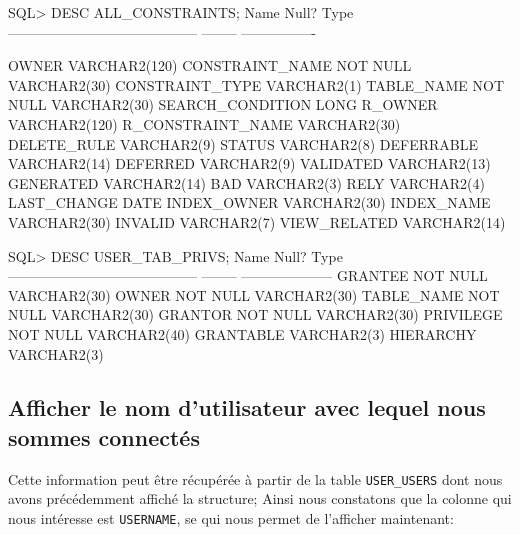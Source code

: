 \documentclass[•]{article}
\begin{document}
\begin{sql}
SQL> DESC ALL_CONSTRAINTS;
 Name                                      Null?    Type
 ----------------------------------------- -------- ----------------

 OWNER                                              VARCHAR2(120)
 CONSTRAINT_NAME                           NOT NULL VARCHAR2(30)
 CONSTRAINT_TYPE                                    VARCHAR2(1)
 TABLE_NAME                                NOT NULL VARCHAR2(30)
 SEARCH_CONDITION                                   LONG
 R_OWNER                                            VARCHAR2(120)
 R_CONSTRAINT_NAME                                  VARCHAR2(30)
 DELETE_RULE                                        VARCHAR2(9)
 STATUS                                             VARCHAR2(8)
 DEFERRABLE                                         VARCHAR2(14)
 DEFERRED                                           VARCHAR2(9)
 VALIDATED                                          VARCHAR2(13)
 GENERATED                                          VARCHAR2(14)
 BAD                                                VARCHAR2(3)
 RELY                                               VARCHAR2(4)
 LAST_CHANGE                                        DATE
 INDEX_OWNER                                        VARCHAR2(30)
 INDEX_NAME                                         VARCHAR2(30)
 INVALID                                            VARCHAR2(7)
 VIEW_RELATED                                       VARCHAR2(14)
 
 
SQL> DESC USER_TAB_PRIVS;
 Name                                      Null?    Type
 ----------------------------------------- -------- --------------------
 GRANTEE                                   NOT NULL VARCHAR2(30)
 OWNER                                     NOT NULL VARCHAR2(30)
 TABLE_NAME                                NOT NULL VARCHAR2(30)
 GRANTOR                                   NOT NULL VARCHAR2(30)
 PRIVILEGE                                 NOT NULL VARCHAR2(40)
 GRANTABLE                                          VARCHAR2(3)
 HIERARCHY                                          VARCHAR2(3)
\end{sql}



\subsection{Afficher le nom d'utilisateur avec lequel nous sommes connectés}

Cette information peut être récupérée à partir de la table \texttt{USER\_USERS} dont nous avons précédemment affiché la structure; Ainsi nous constatons que la colonne qui nous intéresse est \texttt{USERNAME}, se qui nous permet de l'afficher maintenant:
\end{document}
